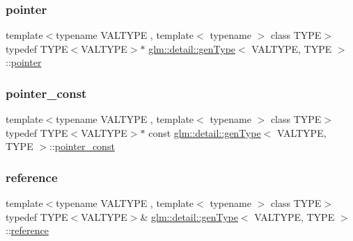 \mbox{\label{structglm_1_1detail_1_1gen_type_a0b4ddd0af4ae5665c60055e5b622808e}} 
\subsubsection{\texorpdfstring{pointer}{pointer}}
{\footnotesize\ttfamily template$<$typename V\+A\+L\+T\+Y\+PE , template$<$ typename $>$ class T\+Y\+PE$>$ \\
typedef T\+Y\+PE$<$V\+A\+L\+T\+Y\+PE$>$$\ast$ \hyperlink{structglm_1_1detail_1_1gen_type}{glm\+::detail\+::gen\+Type}$<$ V\+A\+L\+T\+Y\+PE, T\+Y\+PE $>$\+::\hyperlink{structglm_1_1detail_1_1gen_type_a0b4ddd0af4ae5665c60055e5b622808e}{pointer}}

\mbox{\label{structglm_1_1detail_1_1gen_type_a4d7745054035d7efed18ec1d7215bbf0}} 
\subsubsection{\texorpdfstring{pointer\+\_\+const}{pointer\_const}}
{\footnotesize\ttfamily template$<$typename V\+A\+L\+T\+Y\+PE , template$<$ typename $>$ class T\+Y\+PE$>$ \\
typedef T\+Y\+PE$<$V\+A\+L\+T\+Y\+PE$>$$\ast$ const \hyperlink{structglm_1_1detail_1_1gen_type}{glm\+::detail\+::gen\+Type}$<$ V\+A\+L\+T\+Y\+PE, T\+Y\+PE $>$\+::\hyperlink{structglm_1_1detail_1_1gen_type_a4d7745054035d7efed18ec1d7215bbf0}{pointer\+\_\+const}}

\mbox{\label{structglm_1_1detail_1_1gen_type_a14792cf03ce9cfb37becd2da5d9ae06a}} 
\subsubsection{\texorpdfstring{reference}{reference}}
{\footnotesize\ttfamily template$<$typename V\+A\+L\+T\+Y\+PE , template$<$ typename $>$ class T\+Y\+PE$>$ \\
typedef T\+Y\+PE$<$V\+A\+L\+T\+Y\+PE$>$\& \hyperlink{structglm_1_1detail_1_1gen_type}{glm\+::detail\+::gen\+Type}$<$ V\+A\+L\+T\+Y\+PE, T\+Y\+PE $>$\+::\hyperlink{structglm_1_1detail_1_1gen_type_a14792cf03ce9cfb37becd2da5d9ae06a}{reference}}

